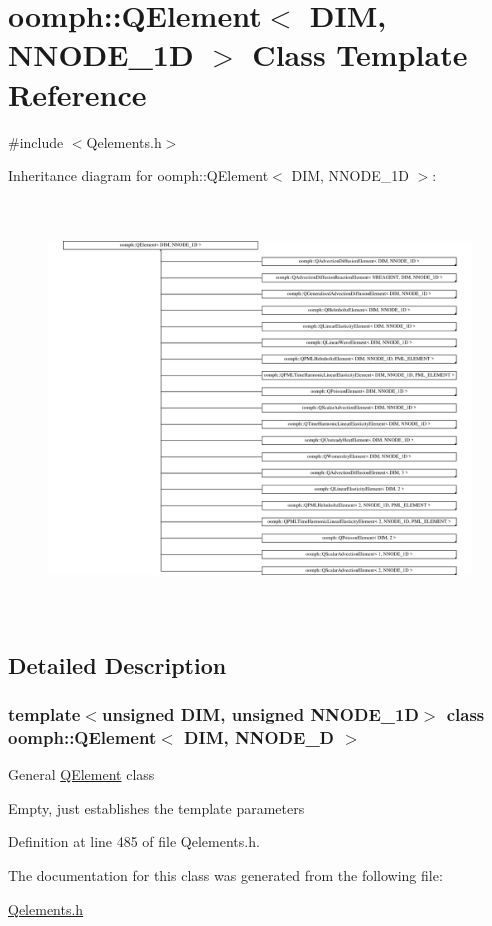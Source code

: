 \hypertarget{classoomph_1_1QElement}{}\section{oomph\+:\+:Q\+Element$<$ D\+IM, N\+N\+O\+D\+E\+\_\+1D $>$ Class Template Reference}
\label{classoomph_1_1QElement}


{\ttfamily \#include $<$Qelements.\+h$>$}

Inheritance diagram for oomph\+:\+:Q\+Element$<$ D\+IM, N\+N\+O\+D\+E\+\_\+1D $>$\+:\begin{figure}[H]
\begin{center}
\leavevmode
\includegraphics[height=11.031895cm]{classoomph_1_1QElement}
\end{center}
\end{figure}


\subsection{Detailed Description}
\subsubsection*{template$<$unsigned D\+IM, unsigned N\+N\+O\+D\+E\+\_\+1D$>$\newline
class oomph\+::\+Q\+Element$<$ D\+I\+M, N\+N\+O\+D\+E\+\_\+D $>$}

General \hyperlink{classoomph_1_1QElement}{Q\+Element} class

Empty, just establishes the template parameters 

Definition at line 485 of file Qelements.\+h.



The documentation for this class was generated from the following file\+:\begin{DoxyCompactItemize}
\item 
\hyperlink{Qelements_8h}{Qelements.\+h}\end{DoxyCompactItemize}
